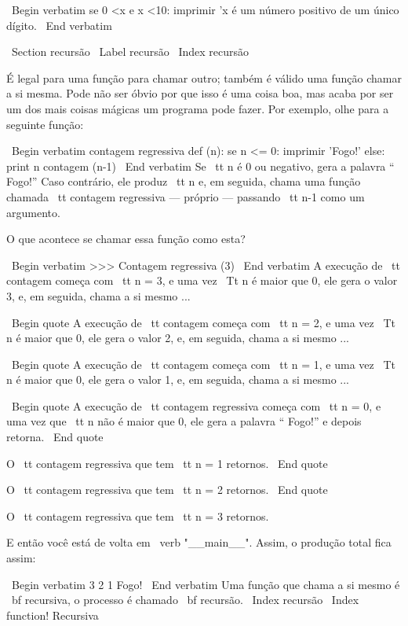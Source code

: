 \documentclass[10pt]{book}
\begin{document}
{{\ Begin {verbatim}
se 0 <x e x <10:
    imprimir 'x é um número positivo de um único dígito.
\ End {verbatim}


\ Section {recursão}
\ Label {recursão}
\ Index {recursão}

É legal para uma função para chamar outro;
também é válido uma função chamar a si mesma. Pode não ser óbvio
por que isso é uma coisa boa, mas acaba por ser um dos mais
coisas mágicas um programa pode fazer.
Por exemplo, olhe para a seguinte função:

\ Begin {verbatim}
contagem regressiva def (n):
    se n <= 0:
        imprimir 'Fogo!'
    else:
        print n
        contagem (n-1)
\ End {verbatim}
%
Se {\ tt n} é 0 ou negativo, gera a palavra `` Fogo!''
Caso contrário, ele produz {\ tt n} e, em seguida, chama uma função chamada {\ tt
contagem regressiva} --- próprio --- passando {\ tt n-1} como um argumento.

O que acontece se chamar essa função como esta?

\ Begin {verbatim}
>>> Contagem regressiva (3)
\ End {verbatim}
%
A execução de {\ tt} contagem começa com {\ tt n = 3}, e uma vez
{\ Tt n} é maior que 0, ele gera o valor 3, e, em seguida, chama a si mesmo ...

\ Begin {quote}
A execução de {\ tt} contagem começa com {\ tt n = 2}, e uma vez
{\ Tt n} é maior que 0, ele gera o valor 2, e, em seguida, chama a si mesmo ...

\ Begin {quote}
A execução de {\ tt} contagem começa com {\ tt n = 1}, e uma vez
{\ Tt n} é maior que 0, ele gera o valor 1, e, em seguida, chama a si mesmo ...

\ Begin {quote}
A execução de {\ tt contagem regressiva} começa com {\ tt n = 0}, e uma vez que {\ tt
n} não é maior que 0, ele gera a palavra `` Fogo!'' e depois
retorna.
\ End {quote}

O {\ tt contagem regressiva} que tem {\ tt n = 1} retornos.
\ End {quote}

O {\ tt contagem regressiva} que tem {\ tt n = 2} retornos.
\ End {quote}

O {\ tt contagem regressiva} que tem {\ tt n = 3} retornos.

E então você está de volta em \ verb "__main__". Assim, o
produção total fica assim:

\ Begin {verbatim}
3
2
1
Fogo!
\ End {verbatim}
%
Uma função que chama a si mesmo é {\ bf recursiva}, o processo é
chamado {\ bf recursão}.
\ Index {recursão}
\ Index {function! Recursiva}

}}
\end{document}
